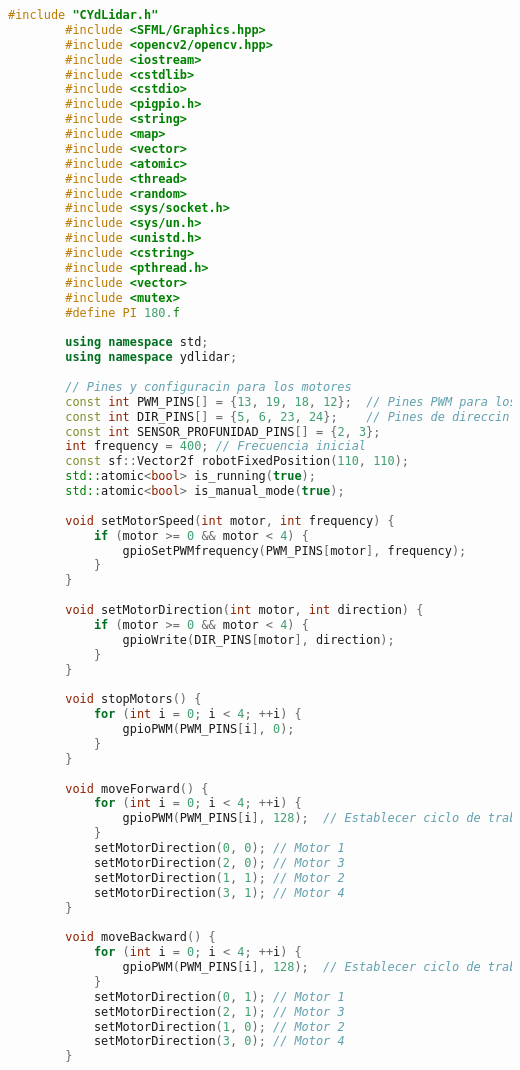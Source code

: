       \begin{lstlisting}[language={C++}, caption={Quinto ajuste de c\'odigo}, label={QuintoAjuste}]
        #include "CYdLidar.h"
        #include <SFML/Graphics.hpp>
        #include <opencv2/opencv.hpp>
        #include <iostream>
        #include <cstdlib>
        #include <cstdio>
        #include <pigpio.h>
        #include <string>
        #include <map>
        #include <vector>
        #include <atomic>
        #include <thread>
        #include <random>
        #include <sys/socket.h>
        #include <sys/un.h>
        #include <unistd.h>
        #include <cstring>
        #include <pthread.h>
        #include <vector>
        #include <mutex>
        #define PI 180.f
        
        using namespace std;
        using namespace ydlidar;
        
        // Pines y configuracin para los motores
        const int PWM_PINS[] = {13, 19, 18, 12};  // Pines PWM para los motores
        const int DIR_PINS[] = {5, 6, 23, 24};    // Pines de direccin para los motores
        const int SENSOR_PROFUNIDAD_PINS[] = {2, 3};
        int frequency = 400; // Frecuencia inicial
        const sf::Vector2f robotFixedPosition(110, 110);
        std::atomic<bool> is_running(true);
        std::atomic<bool> is_manual_mode(true);
        
        void setMotorSpeed(int motor, int frequency) {
            if (motor >= 0 && motor < 4) {
                gpioSetPWMfrequency(PWM_PINS[motor], frequency);
            }
        }
        
        void setMotorDirection(int motor, int direction) {
            if (motor >= 0 && motor < 4) {
                gpioWrite(DIR_PINS[motor], direction);
            }
        }
        
        void stopMotors() {
            for (int i = 0; i < 4; ++i) {
                gpioPWM(PWM_PINS[i], 0);
            }
        }
        
        void moveForward() {
            for (int i = 0; i < 4; ++i) {
                gpioPWM(PWM_PINS[i], 128);  // Establecer ciclo de trabajo al 50%
            }
            setMotorDirection(0, 0); // Motor 1
            setMotorDirection(2, 0); // Motor 3
            setMotorDirection(1, 1); // Motor 2
            setMotorDirection(3, 1); // Motor 4
        }
        
        void moveBackward() {
            for (int i = 0; i < 4; ++i) {
                gpioPWM(PWM_PINS[i], 128);  // Establecer ciclo de trabajo al 50%
            }
            setMotorDirection(0, 1); // Motor 1
            setMotorDirection(2, 1); // Motor 3
            setMotorDirection(1, 0); // Motor 2
            setMotorDirection(3, 0); // Motor 4
        }
        

\end{lstlisting}
